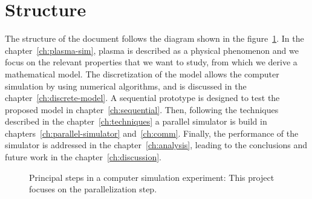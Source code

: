\section{Structure}
%
The structure of the document follows the diagram shown in the 
figure~\ref{fig:structure}. In the chapter~\ref{ch:plasma-sim}, plasma is 
described as a physical phenomenon and we focus on the relevant properties that 
we want to study, from which we derive a mathematical model.  The discretization 
of the model allows the computer simulation by using numerical algorithms, and 
is discussed in the chapter~\ref{ch:discrete-model}. A sequential prototype is 
designed to test the proposed model in chapter~\ref{ch:sequential}.  Then, 
following the techniques described in the chapter~\ref{ch:techniques} a parallel 
simulator is build in chapters~\ref{ch:parallel-simulator} and~\ref{ch:comm}.
Finally, the performance of the simulator is addressed in the 
chapter~\ref{ch:analysis}, leading to the conclusions and future work in the 
chapter~\ref{ch:discussion}.
%
\begin{figure}[ht]%
\centering
\scalebox{0.7} {
}
\caption{Principal steps in a computer simulation experiment: This project 
focuses on the parallelization step.}
\label{fig:structure}
\end{figure}%
%


